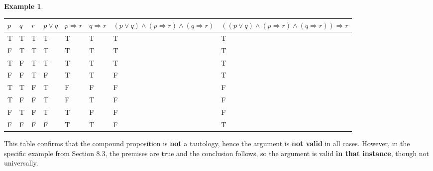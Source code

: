 \documentclass[
]{book}
\theoremstyle{definition}
\theoremstyle{definition}
\newtheorem{example}{Example}[chapter]
\theoremstyle{definition}
\theoremstyle{definition}
\theoremstyle{remark}
\begin{document}
\begin{example}
\begin{longtable}[]{@{}
  >{\centering\arraybackslash}p{}
  >{\centering\arraybackslash}p{}
  >{\centering\arraybackslash}p{}
  >{\centering\arraybackslash}p{}
  >{\centering\arraybackslash}p{}
  >{\centering\arraybackslash}p{}
  >{\centering\arraybackslash}p{}
  >{\centering\arraybackslash}p{}@{}}
\toprule\noalign{}
\begin{minipage}[b]{\linewidth}\centering
\(p\)
\end{minipage} & \begin{minipage}[b]{\linewidth}\centering
\(q\)
\end{minipage} & \begin{minipage}[b]{\linewidth}\centering
\(r\)
\end{minipage} & \begin{minipage}[b]{\linewidth}\centering
\(p \lor q\)
\end{minipage} & \begin{minipage}[b]{\linewidth}\centering
\(p \Rightarrow r\)
\end{minipage} & \begin{minipage}[b]{\linewidth}\centering
\(q \Rightarrow r\)
\end{minipage} & \begin{minipage}[b]{\linewidth}\centering
\((p \lor q) \land (p \Rightarrow r) \land (q \Rightarrow r)\)
\end{minipage} & \begin{minipage}[b]{\linewidth}\centering
\(((p \lor q) \land (p \Rightarrow r) \land (q \Rightarrow r)) \Rightarrow r\)
\end{minipage} \\
\midrule\noalign{}
\endhead
\bottomrule\noalign{}
\endlastfoot
T & T & T & T & T & T & T & T \\
F & T & T & T & T & T & T & T \\
T & F & T & T & T & T & T & T \\
F & F & T & F & T & T & F & T \\
T & T & F & T & F & F & F & F \\
T & F & F & T & F & T & F & F \\
F & T & F & T & T & F & F & F \\
F & F & F & F & T & T & F & T \\
\end{longtable}

This table confirms that the compound proposition is \textbf{not} a tautology, hence the argument is \textbf{not valid} in all cases. However, in the specific example from Section 8.3, the premises are true and the conclusion follows, so the argument is valid \textbf{in that instance}, though not universally.
\end{example}
\end{document}
